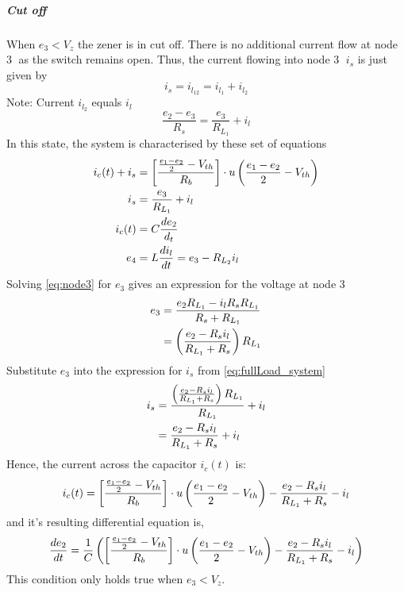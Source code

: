 \subparagraph{Cut off}
When $e_3 < V_z$ the zener is in cut off. There is no additional current flow at node \textcircled{3} as the switch remains open. Thus, the current flowing into node \textcircled{3} $i_s$ is just given by $$i_s = i_{l_{12}} = i_{l_1} + i_{l_2}$$
Note: Current $i_{l_2}$ equals $i_l$
\begin{equation}
	\frac{e_2 - e_3}{R_s} = \frac{e_3}{R_{L_1}} + i_l
	\label{eq:node3}
\end{equation}
In this state, the system is characterised by these set of equations
\begin{align}
	i_c(t) + i_s &= \left[\frac{\frac{e_1 - e_2}{2} - V_{th}}{R_b} \right]\cdot u\left(\frac{e_1 - e_2}{2} - V_{th} \right) \\
	i_s &= \frac{e_3}{R_{L_1}} + i_l \\
	i_c(t) &= C \frac{de_2}{d_t} \\
	e_4 &= L\frac{di_l}{dt} = e_3 - R_{L_2}i_l
	\label{eq:fullLoad_system}
\end{align}
Solving \eqref{eq:node3} for $e_3$ gives an expression for the voltage at node \textcircled{3}
\begin{equation}
\begin{split}
	e_3 &= \frac{e_2R_{L_1} - i_l R_s R_{L_1}}{R_s + R_{L_1}} \\
	    &= \left(\frac{e_2 - R_s i_l}{R_{L_1} + R_s} \right)R_{L_1}
\end{split}
\label{eq:e3_il}
\end{equation}
Substitute $e_3$ into the expression for $i_s$ from \eqref{eq:fullLoad_system}
\begin{equation}
 \begin{split}
	i_s &= \frac{\left(\frac{e_2 - R_s i_l}{R_{L_1} + R_s} \right)R_{L_1}}{R_{L_1}} + i_l \\
		&= \frac{e_2 - R_s i_l}{R_{L_1} + R_s} + i_l
 \end{split}
\end{equation}
Hence, the current across the capacitor $i_c(t)$ is:
\begin{equation}
	i_c(t) = \left[\frac{\frac{e_1 - e_2}{2} - V_{th}}{R_b} \right]\cdot u\left(\frac{e_1 - e_2}{2} - V_{th} \right) - \frac{e_2 - R_s i_l}{R_{L_1} + R_s} - i_l
\end{equation}
and it's resulting differential equation is,
\begin{equation}
	\frac{de_2}{dt} = \frac{1}{C}\left(\left[\frac{\frac{e_1 - e_2}{2} - V_{th}}{R_b} \right]\cdot u\left(\frac{e_1 - e_2}{2} - V_{th} \right) - \frac{e_2 - R_s i_l}{R_{L_1} + R_s} - i_l \right)
	\label{eq:fullLoad_DiffEq1}
\end{equation}
This condition only holds true when $e_3 < V_z$.

